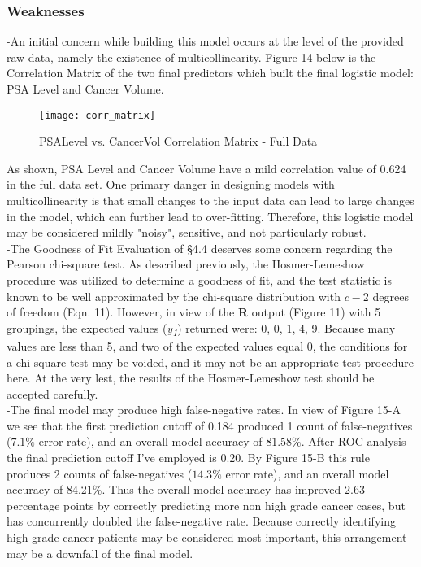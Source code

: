 \subsubsection{Weaknesses}
-An initial concern while building this model occurs at the level of the provided raw data, namely the existence of multicollinearity. Figure 14 below is the Correlation Matrix of the two final predictors which built the final logistic model: PSA Level and Cancer Volume.

\begin{figure}[H]
	\centering
	\texttt{[image: corr\_matrix]}
	\caption{PSALevel vs. CancerVol Correlation Matrix - Full Data}
\end{figure}

As shown, PSA Level and Cancer Volume have a mild correlation value of 0.624 in the full data set. One primary danger in designing models with multicollinearity is that small changes to the input data can lead to large changes in the model, which can further lead to over-fitting. Therefore, this logistic model may be considered mildly "noisy", sensitive, and not particularly robust. \\

-The Goodness of Fit Evaluation of \S4.4 deserves some concern regarding the Pearson chi-square test. As described previously, the Hosmer-Lemeshow procedure was utilized to determine a goodness of fit, and the test statistic is known to be well approximated by the chi-square distribution with \(c-2\) degrees of freedom (Eqn. 11). However, in view of the \textbf{R} output (Figure 11) with 5 groupings, the expected values (\textit{y\textsubscript{1}}) returned were: 0, 0, 1, 4, 9. Because many values are less than 5, and two of the expected values equal 0, the conditions for a chi-square test may be voided, and it may not be an appropriate test procedure here. At the very lest, the results of the Hosmer-Lemeshow test should be accepted carefully. \\

-The final model may produce high false-negative rates. In view of Figure 15-A we see that the first prediction cutoff of 0.184 produced 1 count of false-negatives (\(7.1\%\) error rate), and an overall model accuracy of \(81.58\%\). After ROC analysis the final prediction cutoff I've employed is 0.20. By Figure 15-B this rule produces 2 counts of false-negatives (\(14.3\%\) error rate), and an overall model accuracy of 84.21\%. Thus the overall model accuracy has improved 2.63 percentage points by correctly predicting more non high grade cancer cases, but has concurrently doubled the false-negative rate. Because correctly identifying high grade cancer patients may be considered most important, this arrangement may be a downfall of the final model.

